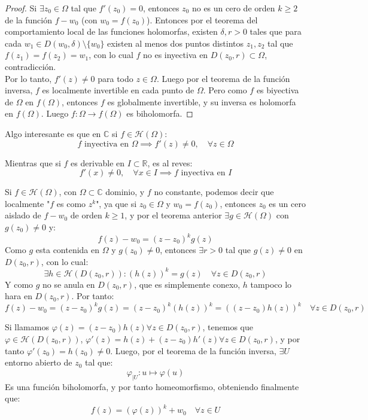 \begin{proof}
    Si $\exists z_0 \in \Omega$ tal que $f'(z_0) = 0$, entonces $z_0$ no es un cero de orden $k \geq 2$ de la función $f - w_0$ (con $w_0 = f(z_0)$). Entonces por el teorema del comportamiento local de las funciones holomorfas, existen $\delta, r > 0$ tales que para cada $w_1 \in D(w_0, \delta) \setminus \{ w_0 \}$ existen al menos dos puntos distintos $z_1, z_2$ tal que $f(z_1) = f(z_2) = w_1$, con lo cual $f$ no es inyectiva en $D(z_0,r) \subset \Omega$, contradicción.\\
    Por lo tanto, $f'(z) \neq 0$ para todo $z \in \Omega$. Luego por el teorema de la función inversa, $f$ es localmente invertible en cada punto de $\Omega$. Pero como $f$ es biyectiva de $\Omega$ en $f(\Omega)$, entonces $f$ es globalmente invertible, y su inversa es holomorfa en $f(\Omega)$. Luego $f : \Omega \to f(\Omega)$ es biholomorfa.
\end{proof}

Algo interesante es que en $\mathbb{C}$ si $f \in \mathcal{H}(\Omega)$:
\[
    f \text{ inyectiva en } \Omega \implies f' (z) \neq 0, \quad \forall z \in \Omega
\]

Mientras que si $f$ es derivable en $I \subset \mathbb{R}$, es al reves:
\[
    f' (x) \neq 0, \quad \forall x \in I \implies f \text{ inyectiva en } I
\]

Si $f \in \mathcal{H}(\Omega)$, con $\Omega \subset \mathbb{C}$ dominio, y $f$ no constante, podemos decir que localmente "$f$ es como $z^k$", ya que si $z_0 \in \Omega$ y $w_0 = f(z_0)$, entonces $z_0$ es un cero aislado de $f - w_0$ de orden $k \geq 1$, y por el teorema anterior $\exists g \in \mathcal{H}(\Omega)$ con $g(z_0) \neq 0$ y:
\[
f(z) - w_0 = (z - z_0)^k g(z)
\]
Como $g$ esta contenida en $\Omega$ y $g(z_0) \neq 0$, entonces $\exists r > 0$ tal que $g(z) \neq 0$ en $D(z_0,r)$, con lo cual:
\[
\exists h \in \mathcal{H}(D(z_0,r)) : (h(z))^k = g(z) \quad \forall z \in D(z_0,r)
\]
Y como $g$ no se anula en $D(z_0,r)$, que es simplemente conexo, $h$ tampoco lo hara en $D(z_0,r)$. Por tanto:
\[
f(z) - w_0 =
(z - z_0)^k g(z) =
(z - z_0)^k (h(z))^k =
\left((z - z_0) h(z)\right)^k \quad \forall z \in D(z_0,r)
\]

Si llamamos $\varphi(z) = (z - z_0) h(z) \forall z \in D(z_0,r)$, tenemos que $\varphi \in \mathcal{H}(D(z_0,r))$, $\varphi'(z) = h(z) + (z - z_0) h'(z) \forall z \in D(z_0,r)$, y por tanto $\varphi'(z_0) = h(z_0) \neq 0$. Luego, por el teorema de la función inversa, $\exists U$ entorno abierto de $z_0$ tal que:
\[
\varphi_{|U} : u \mapsto \varphi(u)
\]
Es una función biholomorfa, y por tanto homeomorfismo, obteniendo finalmente que:
\[
f(z) = (\varphi(z))^k + w_0 \quad \forall z \in U
\]

